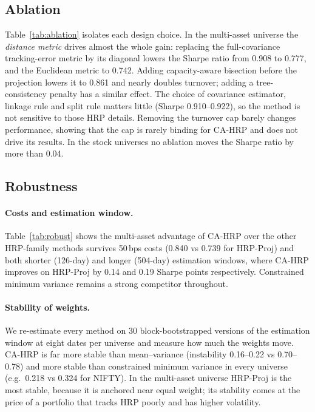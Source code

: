 

\subsection{Ablation}
Table~\ref{tab:ablation} isolates each design choice. In the multi-asset universe the
\emph{distance metric} drives almost the whole gain: replacing the full-covariance
tracking-error metric by its diagonal lowers the Sharpe ratio from 0.908 to 0.777, and the
Euclidean metric to 0.742. Adding capacity-aware bisection before the projection lowers it
to 0.861 and nearly doubles turnover; adding a tree-consistency penalty has a similar
effect. The choice of covariance estimator, linkage rule and split rule matters little
(Sharpe 0.910--0.922), so the method is not sensitive to those HRP details. Removing the
turnover cap barely changes performance, showing that the cap is rarely binding for CA-HRP
and does not drive its results. In the stock universes no ablation moves the Sharpe ratio
by more than 0.04.



\subsection{Robustness}
\paragraph{Costs and estimation window.} Table~\ref{tab:robust} shows the multi-asset
advantage of CA-HRP over the other HRP-family methods survives 50\,bps costs (0.840 vs 0.739
for HRP-Proj) and both shorter (126-day) and longer (504-day) estimation windows, where
CA-HRP improves on HRP-Proj by 0.14 and 0.19 Sharpe points respectively. Constrained minimum
variance remains a strong competitor throughout.

\paragraph{Stability of weights.} We re-estimate every method on 30 block-bootstrapped
versions of the estimation window at eight dates per universe and measure how much the
weights move. CA-HRP is far more stable than mean--variance (instability 0.16--0.22 vs
0.70--0.78) and more stable than constrained minimum variance in every universe (e.g.\
0.218 vs 0.324 for NIFTY). In the multi-asset universe HRP-Proj is the most stable, because
it is anchored near equal weight; its stability comes at the price of a portfolio that
tracks HRP poorly and has higher volatility.

